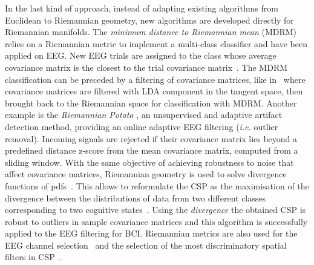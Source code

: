 {  
In the last kind of approach, instead of adapting existing algorithms from Euclidean to Riemannian geometry, new algorithms are developed directly for Riemannian manifolds.
The \emph{minimum distance to Riemannian mean} (MDRM) relies on a Riemannian metric to implement a multi-class classifier and have been applied on EEG.
New EEG trials are assigned to the class whose average covariance matrix is the closest to the trial covariance matrix~\citep{barachant2012multiclass}.
The MDRM classification can be preceded by a filtering of covariance matrices, like in~\citep{barachant2010riemannian} where covariance matrices are filtered with LDA component in the tangent space, then brought back to the Riemannian space for classification with MDRM. 
Another example is the \emph{Riemannian Potato} \citep{barachant2013riemannian}, an unsupervised and adaptive artifact detection method, providing an online adaptive EEG filtering (\textit{i.e.} outlier removal). 
Incoming signals are rejected if their covariance matrix lies beyond a predefined distance z-score from the mean covariance matrix, computed from a sliding window.
With the same objective of achieving robustness to noise that affect covariance matrices, Riemannian geometry is used to solve divergence functions of pdfs~\citep{amari2010information}.
This allows to reformulate the CSP as the maximisation of the divergence between the distributions of data from two different classes corresponding to two cognitive states~\citep{samek2013robust, samek2014information}. 
Using the \emph{\beta divergence} the obtained CSP is robust to outliers in sample covariance matrices and this algorithm is successfully applied to the EEG filtering for BCI.   
Riemannian metrics are also used for the EEG channel selection~\citep{barachant2011channel} and the selection of the most discriminatory spatial filters in CSP~\citep{barachant2010common}.  


}
